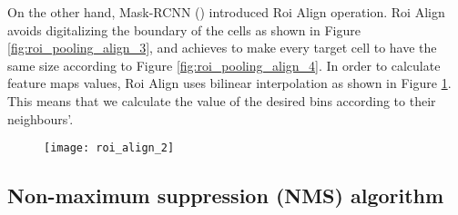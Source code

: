 On the other hand, Mask-RCNN (\cite{DBLP:journals/corr/HeGDG17}) introduced Roi Align operation. Roi Align avoids digitalizing
the boundary of the cells as shown in Figure \ref{fig:roi_pooling_align_3}, and achieves to make every target cell to have the same size
according to Figure \ref{fig:roi_pooling_align_4}. In order to calculate feature maps values, Roi Align uses bilinear interpolation as
shown in Figure \ref{fig:roi_align_2}. This means that we calculate the value of the desired bins according to their neighbours'.

\begin{figure}[h]
  \centering
  \texttt{[image: roi\_align\_2]}
  \caption{}
  \label{fig:roi_align_2}
\end{figure}


\subsection{Non-maximum suppression (NMS) algorithm}

